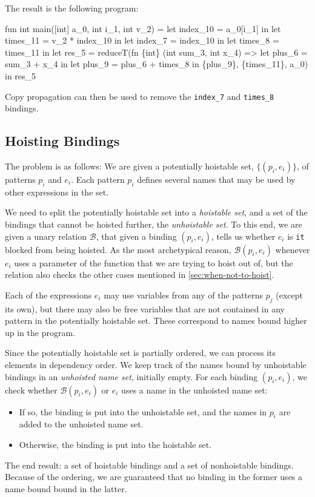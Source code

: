 The result is the following program:

\begin{colorcode}
fun int main([int] a_0, int i_1, int v_2) =
  let index_10 = a_0[i_1] in
  let times_11 = v_2 * index_10 in
  let index_7 = index_10 in
  let times_8 = times_11 in
  let {res_5} =
    reduceT(fn \{int\} (int sum_3, int x_4) =>
              let plus_6 = sum_3 + x_4 in
              let plus_9 = plus_6 + times_8 in
              \{plus_9\},
            \{times_11\}, a_0) in
  res_5
\end{colorcode}

Copy propagation can then be used to remove the \texttt{index\_7} and
\texttt{times\_8} bindings.

\subsection{Hoisting Bindings}

The problem is as follows: We are given a potentially hoistable set,
$\{(p_{i}, e_{i})\}$, of patterns $p_{i}$ and $e_{i}$.  Each pattern
$p_{i}$ defines several names that may be used by other expressions in
the set.

We need to split the potentially hoistable set into a
\textit{hoistable set}, and a set of the bindings that cannot be
hoisted further, the \textit{unhoistable set}.  To this end, we are
given a unary relation $\mathcal{B}$, that given a binding $(p_{i},
e_{i})$, tells us whether $e_{i}$ is \texttt{it} blocked from being
hoisted.  As the most archetypical reason, $\mathcal{B}(p_{i}, e_{i})$
whenever $e_{i}$ uses a parameter of the function that we are trying
to hoist out of, but the relation also checks the other cases
mentioned in \cref{sec:when-not-to-hoist}.

Each of the expressions $e_{i}$ may use variables from any of the
patterns $p_{j}$ (except its own), but there may also be free
variables that are not contained in any pattern in the potentially
hoistable set.  These correspond to names bound higher up in the
program.

Since the potentially hoistable set is partially ordered, we can
process its elements in dependency order.  We keep track of the names
bound by unhoistable bindings in an \textit{unhoisted name set},
initially empty.  For each binding $(p_{i},e_{i})$, we check whether
$\mathcal{B}(p_{i},e_{i})$ or $e_{i}$ uses a name in the unhoisted
name set:
\begin{itemize}
\item If so, the binding is put into the unhoistable set, and the
  names in $p_{i}$ are added to the unhoisted name set.
\item Otherwise, the binding is put into the hoistable set.
\end{itemize}
The end result: a set of hoistable bindings and a set of nonhoistable
bindings.  Because of the ordering, we are guaranteed that no binding
in the former uses a name bound bound in the latter.

